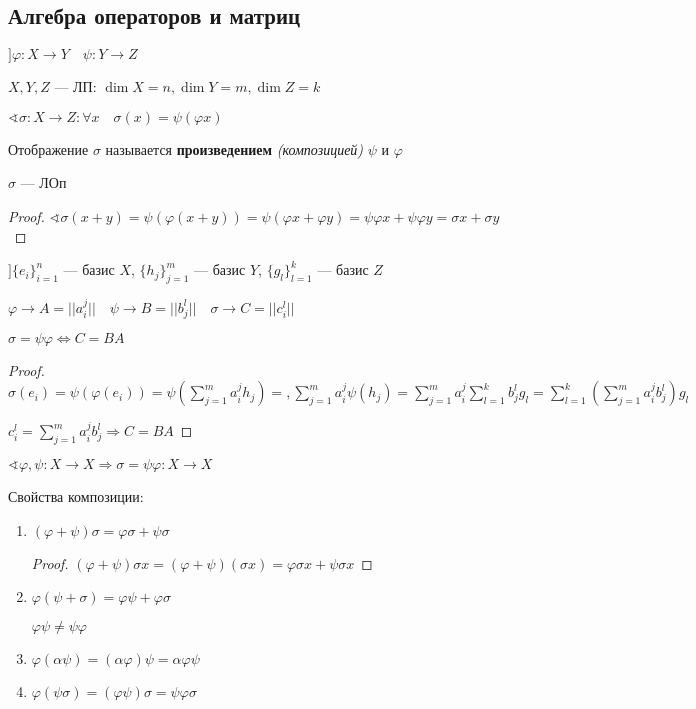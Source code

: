 \subsection{Алгебра операторов и матриц}

$] \varphi : X \to Y \quad \psi : Y\to Z$

$X, Y, Z$ --- ЛП: $\dim X = n, \dim Y = m, \dim Z = k$

$\sphericalangle \sigma : X\to Z : \forall x \quad \sigma(x)=\psi(\varphi x)$

\begin{definition}
    Отображение $\sigma$ называется \textbf{произведением} \textit{(композицией)} $\psi$ и $\varphi$ 
\end{definition}

\begin{lemma}
    $\sigma$ --- ЛОп
\end{lemma}
\begin{proof}
    $\sphericalangle \sigma(x+y)=\psi(\varphi(x+y))=\psi(\varphi x + \varphi y) = \psi\varphi x + \psi \varphi y = \sigma x + \sigma y$
\end{proof}

$] \{e_i\}_{i=1}^n$ --- базис $X$, $\{h_j\}_{j=1}^m$ --- базис $Y$, $\{g_l\}_{l=1}^k$ --- базис $Z$

$\varphi\to A=||a^j_i|| \quad \psi \to B=||b^l_j|| \quad \sigma \to C=||c_i^l||$

\begin{theorem}
    $\sigma = \psi\varphi \Leftrightarrow C=BA$
\end{theorem}
\begin{proof}
    $\sigma(e_i)=\psi(\varphi(e_i))=\psi(\sum\limits_{j=1}^m a_i^j h_j) = ,\sum\limits_{j=1}^m a_i^j \psi(h_j)=\sum\limits_{j=1}^m a_i^j \sum\limits_{l=1}^k b_j^l g_l = \sum\limits_{l=1}^k \left(\sum\limits_{j=1}^m a_i^j b_j^l \right) g_l$

    $c_i^l=\sum\limits_{j=1}^m a_i^j b_j^l \Rightarrow C=BA$
\end{proof}

$\sphericalangle \varphi, \psi : X\to X \Rightarrow \sigma = \psi \varphi : X\to X$

Свойства композиции:
\begin{enumerate}
    \item $(\varphi+\psi)\sigma = \varphi\sigma + \psi\sigma$
    \begin{proof}
        $(\varphi+\psi)\sigma x = (\varphi + \psi)(\sigma x) = \varphi\sigma x + \psi \sigma x$
    \end{proof}
    \item $\varphi(\psi + \sigma)=\varphi\psi + \varphi\sigma$
    \begin{remark}
        $\varphi\psi\not=\psi\varphi$
    \end{remark}
    \item $\varphi(\alpha\psi) = (\alpha \varphi)\psi = \alpha \varphi \psi$
    \item $\varphi(\psi \sigma) = (\varphi\psi)\sigma = \psi \varphi \sigma$
\end{enumerate}


